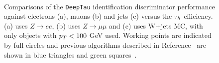 \begin{figure}[!hbtp]
\centering
     \\
\caption{Comparisons of the \texttt{DeepTau} identification discriminator performance against electrons (a), muons (b) and jets (c) versus the $\tau_{h}$ efficiency. (a) uses $Z\rightarrow ee$, (b) uses $Z\rightarrow \mu\mu$ and (c) uses W+jets MC, with only objects with $p_{T}<100$ GeV used. Working points are indicated by full circles and previous algorithms described in Reference~\cite{CMS:2018jrd} are shown in blue triangles and green squares~\cite{CMS:2022prd}.}
\label{fig:deeptau_misid}
\end{figure}
